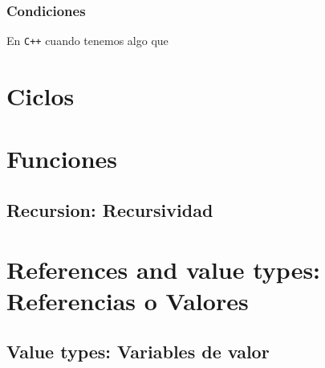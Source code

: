 \documentclass[12pt, fleqn]{report}                             %
\theoremstyle{break}                                            %
\newcommand \Cpp  {\texttt{C++} }                               %
\begin{document}
                \subsubsection{Condiciones}

                En \Cpp cuando tenemos algo que  


        \section{Ciclos}

        \section{Funciones}

            \subsection{Recursion: Recursividad}


        \section{References and value types: Referencias o Valores}

            \subsection{Value types: Variables de valor}
\end{document}
